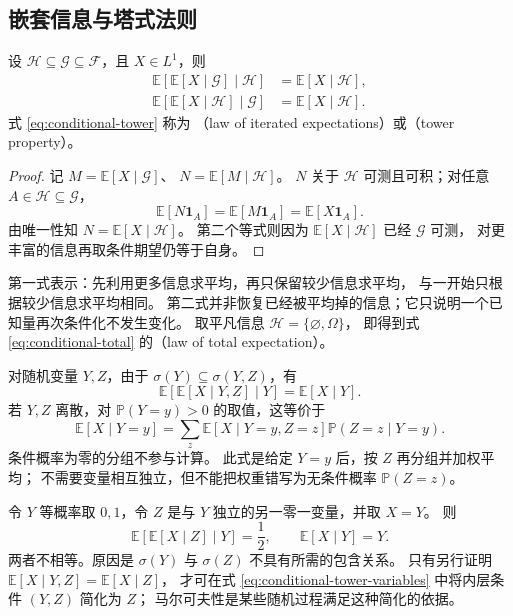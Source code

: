 \documentclass[UTF8]{ctexart}
\begin{document}
\subsection{嵌套信息与塔式法则}

\begin{theorem}[条件期望的迭代法则]
\label{thm:conditional-tower}
设 $\mathcal H\subseteq\mathcal G\subseteq\mathcal F$，且 $X\in L^1$，则
\begin{align}
  \mathbb E[\mathbb E[X\mid\mathcal G]\mid\mathcal H]
    &=\mathbb E[X\mid\mathcal H],
    \label{eq:conditional-tower}\\
  \mathbb E[\mathbb E[X\mid\mathcal H]\mid\mathcal G]
    &=\mathbb E[X\mid\mathcal H].
    \label{eq:conditional-tower-reverse}
\end{align}
式 \eqref{eq:conditional-tower} 称为
（law of iterated expectations）或（tower property）。
\end{theorem}

\begin{proof}
记 $M=\mathbb E[X\mid\mathcal G]$、
$N=\mathbb E[M\mid\mathcal H]$。
$N$ 关于 $\mathcal H$ 可测且可积；对任意 $A\in\mathcal H\subseteq\mathcal G$，
\[
  \mathbb E[N\mathbf1_A]
  =\mathbb E[M\mathbf1_A]
  =\mathbb E[X\mathbf1_A].
\]
由唯一性知 $N=\mathbb E[X\mid\mathcal H]$。
第二个等式则因为 $\mathbb E[X\mid\mathcal H]$ 已经 $\mathcal G$ 可测，
对更丰富的信息再取条件期望仍等于自身。
\end{proof}

第一式表示：先利用更多信息求平均，再只保留较少信息求平均，
与一开始只根据较少信息求平均相同。
第二式并非恢复已经被平均掉的信息；它只说明一个已知量再次条件化不发生变化。
取平凡信息 $\mathcal H=\{\varnothing,\Omega\}$，
即得到式 \eqref{eq:conditional-total} 的（law of total expectation）。

对随机变量 $Y,Z$，由于 $\sigma(Y)\subseteq\sigma(Y,Z)$，有
\begin{equation}
  \mathbb E[\mathbb E[X\mid Y,Z]\mid Y]
  =\mathbb E[X\mid Y].
  \label{eq:conditional-tower-variables}
\end{equation}
若 $Y,Z$ 离散，对 $\mathbb P(Y=y)>0$ 的取值，这等价于
\[
  \mathbb E[X\mid Y=y]
  =\sum_z
    \mathbb E[X\mid Y=y,Z=z]\mathbb P(Z=z\mid Y=y).
\]
条件概率为零的分组不参与计算。
此式是给定 $Y=y$ 后，按 $Z$ 再分组并加权平均；
不需要变量相互独立，但不能把权重错写为无条件概率 $\mathbb P(Z=z)$。

\begin{example}[条件信息不能任意删去]
\label{ex:conditional-nonnested}
令 $Y$ 等概率取 $0,1$，令 $Z$ 是与 $Y$ 独立的另一零一变量，并取 $X=Y$。
则
\[
  \mathbb E[\mathbb E[X\mid Z]\mid Y]=\frac12,
  \qquad
  \mathbb E[X\mid Y]=Y.
\]
两者不相等。原因是 $\sigma(Y)$ 与 $\sigma(Z)$ 不具有所需的包含关系。
只有另行证明 $\mathbb E[X\mid Y,Z]=\mathbb E[X\mid Z]$，
才可在式 \eqref{eq:conditional-tower-variables} 中将内层条件 $(Y,Z)$ 简化为 $Z$；
马尔可夫性是某些随机过程满足这种简化的依据。
\end{example}
\end{document}
